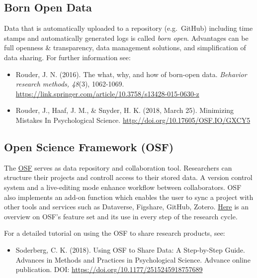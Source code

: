 \documentclass[12pt,]{report}
\providecommand{\tightlist}{%
  \setlength{\itemsep}{0pt}\setlength{\parskip}{0pt}}
\begin{document}
\subsection{Born Open Data}\label{born-open-data}

Data that is automatically uploaded to a repository (e.g.~GitHub)
including time stamps and automatically generated logs is called
\emph{born open}. Advantages can be full openness \& transparency, data
management solutions, and simplification of data sharing. For further
information see:

\begin{itemize}
\tightlist
\item
  Rouder, J. N. (2016). The what, why, and how of born-open data.
  \emph{Behavior research methods, 48}(3), 1062-1069.
  \href{https://link.springer.com/content/pdf/10.3758\%2Fs13428-015-0630-z.pdf}{https://link.springer.com/article/10.3758/s13428-015-0630-z}
\item
  Rouder, J., Haaf, J. M., \& Snyder, H. K. (2018, March 25). Minimizing
  Mistakes In Psychological Science.
  \url{http://doi.org/10.17605/OSF.IO/GXCY5}
\end{itemize}

\subsection{Open Science Framework
(OSF)}\label{open-science-framework-osf}

The \href{https://osf.io/}{OSF} serves as data repository and
collaboration tool. Researchers can structure their projects and
controll access to their stored data. A version control system and a
live-editing mode enhance workflow between collaborators. OSF also
implements an add-on function which enables the user to sync a project
with other tools and services such as Dataverse, Figshare, GitHub,
Zotero. \href{https://cos.io/our-products/osf/}{Here} is an overview on
OSF's feature set and its use in every step of the research cycle.

For a detailed tutorial on using the OSF to share research products,
see:

\begin{itemize}
\tightlist
\item
  Soderberg, C. K. (2018). Using OSF to Share Data: A Step-by-Step
  Guide. Advances in Methods and Practices in Psychological Science.
  Advance online publication. DOI:
  \url{https://doi.org/10.1177/2515245918757689}
\end{itemize}
\end{document}
